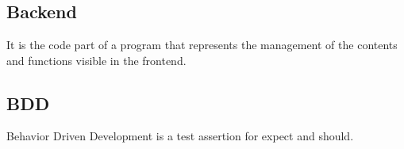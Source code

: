 \section{}



\subsection*{Backend}
It is the code part of a program that represents the management of the contents and functions visible in the frontend.
\subsection*{BDD}
Behavior Driven Development is a test assertion for expect and should.